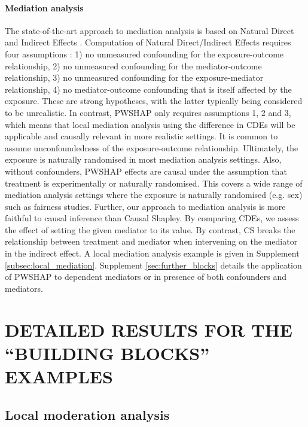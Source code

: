 \paragraph{Mediation analysis}\label{sec:med_analysis}

The state-of-the-art approach to mediation analysis is based on Natural Direct and Indirect Effects . Computation of Natural Direct/Indirect Effects requires four assumptions  : 1) no unmeasured confounding for the exposure-outcome relationship, 2) no unmeasured confounding for the mediator-outcome relationship, 3) no unmeasured confounding for the exposure-mediator relationship, 4) no mediator-outcome confounding that is itself affected by the exposure. These are strong hypotheses, with the latter typically being considered to be unrealistic. In contrast, PWSHAP only requires assumptions 1, 2 and 3, which means that local mediation analysis using the difference in CDEs will be applicable and causally relevant in more realistic settings. It is common to assume unconfoundedness of the exposure-outcome relationship. Ultimately, the exposure is naturally randomised in most mediation analysis settings. Also, without confounders, PWSHAP effects are causal under the assumption that treatment is experimentally or naturally randomised. This covers a wide range of mediation analysis settings where the exposure is naturally randomised (e.g. sex) such as fairness studies. Further, our approach to mediation analysis is more faithful to causal inference than Causal Shapley. By comparing CDEs, we assess the effect of setting the given mediator to its value. By contrast, CS breaks the relationship between treatment and mediator when intervening on the mediator in the indirect effect. A local mediation analysis example is given in Supplement \ref{subsec:local_mediation}. Supplement \ref{sec:further_blocks} details the application of PWSHAP to dependent mediators or in presence of both confounders and mediators.




\section{DETAILED RESULTS FOR THE ``BUILDING BLOCKS'' EXAMPLES} \label{sec:detailed_building_blocks}

\subsection{Local moderation analysis} \label{subsec:local_moderation}

